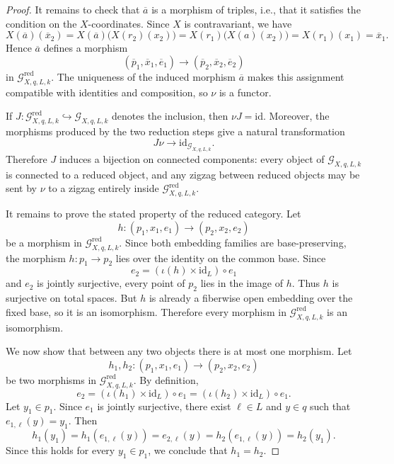 \documentclass{amsart}
\newcommand{\id}{\mathrm{id}}
\theoremstyle{definition}
\numberwithin{equation}{subsection}
\numberwithin{subsubsection}{subsection}
\begin{document}
\begin{proof}
  It remains to check that \(\overline{a}\) is a morphism of triples, i.e., that
  it
  satisfies the condition on the \(X\)-coordinates. Since \(X\) is
  contravariant, we have
  \[
    X(\overline{a})(\overline{x}_2)
    =
    X(\overline{a})\bigl(X(r_2)(x_2)\bigr)
    =
    X(r_1)\bigl(X(a)(x_2)\bigr)
    =
    X(r_1)(x_1)
    =
    \overline{x}_1.
  \]
  Hence \(\overline{a}\) defines a morphism
  \[
    (\overline{p}_1,\overline{x}_1,\overline{e}_1)
    \longrightarrow
    (\overline{p}_2,\overline{x}_2,\overline{e}_2)
  \]
  in \(\mathcal{G}^{\mathrm{red}}_{X,q,L,k}\). The uniqueness of the induced
  morphism \(\overline{a}\) makes this assignment
  compatible with identities and composition, so \(\nu\) is a functor.

  If \(J:\mathcal{G}^{\mathrm{red}}_{X,q,L,k}\hookrightarrow
  \mathcal{G}_{X,q,L,k}\) denotes the inclusion, then \(\nu J=\id\). Moreover,
  the morphisms produced by the two reduction steps give a natural
  transformation
  \[
    J\nu\longrightarrow \id_{\mathcal{G}_{X,q,L,k}}.
  \]
  Therefore \(J\) induces a bijection on connected components: every object of
  \(\mathcal{G}_{X,q,L,k}\) is connected to a reduced object, and any zigzag
  between reduced objects may be sent by \(\nu\) to a zigzag entirely inside
  \(\mathcal{G}^{\mathrm{red}}_{X,q,L,k}\).

  It remains to prove the stated property of the reduced category. Let
  \[
    h:(p_1,x_1,e_1)\longrightarrow (p_2,x_2,e_2)
  \]
  be a morphism in \(\mathcal{G}^{\mathrm{red}}_{X,q,L,k}\). Since both
  embedding families are base-preserving, the morphism \(h:p_1\to p_2\) lies
  over the identity on the common base. Since
  \[
    e_2=(\iota(h)\times \id_L)\circ e_1
  \]
  and \(e_2\) is jointly surjective, every point of \(p_2\) lies in the image
  of \(h\). Thus \(h\) is surjective on total spaces. But \(h\) is already a
  fiberwise open embedding over the fixed base, so it is an isomorphism.
  Therefore every morphism in
  \(\mathcal{G}^{\mathrm{red}}_{X,q,L,k}\) is an isomorphism.

  We now show that between any two objects there is at most one morphism. Let
  \[
    h_1,h_2:(p_1,x_1,e_1)\longrightarrow (p_2,x_2,e_2)
  \]
  be two morphisms in \(\mathcal{G}^{\mathrm{red}}_{X,q,L,k}\). By definition,
  \[
    e_2=(\iota(h_1)\times \id_L)\circ e_1
    =(\iota(h_2)\times \id_L)\circ e_1.
  \]
  Let \(y_1\in p_1\). Since \(e_1\) is jointly surjective, there exist
  \(\ell\in L\) and \(y\in q\) such that \(e_{1,\ell}(y)=y_1\). Then
  \[
    h_1(y_1)
    =h_1(e_{1,\ell}(y))
    =e_{2,\ell}(y)
    =h_2(e_{1,\ell}(y))
    =h_2(y_1).
  \]
  Since this holds for every \(y_1\in p_1\), we conclude that \(h_1=h_2\).


\end{proof}
\end{document}
